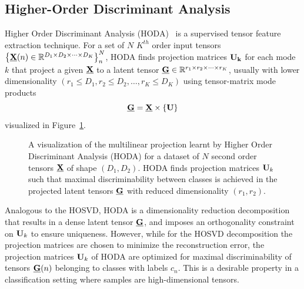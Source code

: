 \documentclass[twocolumn]{article}
\begin{document}
\subsection{Higher-Order Discriminant Analysis}
Higher Order Discriminant Analysis (\textsc{HODA})~\cite{Phan2010} is a
supervised tensor
feature extraction technique. For a set of $N$ $K^{th}$ order input tensors
$\left\{\underline{\mathbf{X}}(n)\in\mathbb{R}^{D_1\times D_2 \times \cdots \times
		D_K}\right\}_n^N$, \textsc{HODA} finds projection matrices $\mathbf{U_k}$ for each mode $k$
that project a given $\underline{\mathbf{X}}$ to a latent tensor
$\underline{\mathbf{G}}\in\mathbb{R}^{r_1\times r_2\times\cdots\times r_K}$, usually with lower
dimensionality $(r_1\leq D_1,r_2\leq D_2,\ldots,r_K\leq D_K)$ using
tensor-matrix mode products
\begin{equation}
	\underline{\mathbf{G}}  = \underline{\mathbf{X}}\times\left\{\mathbf{U}\right\}
	\label{eq:HODA-backward}
\end{equation}
visualized in Figure~\ref{fig:HODA-backward}.
\begin{figure}[t]
	\centering
	
	\caption{A visualization of the multilinear projection learnt by Higher Order
		Discriminant Analysis (\textsc{HODA}) for a dataset of $N$ second order tensors
		$\underline{\mathbf{X}}$ of shape $(D_1,D_2)$.
		\textsc{HODA} finds projection matrices $\mathbf{U}_k$ such that maximal
		discriminability between classes is achieved in the projected latent tensors
		$\underline{\mathbf{G}}$ with reduced dimensionality $(r_1,r_2)$.}
	\label{fig:HODA-backward}
\end{figure}
Analogous to the \textsc{HOSVD}, \textsc{HODA} is a dimensionality
reduction decomposition that results in a dense latent tensor $\underline{\mathbf{G}}$, and
imposes an orthogonality constraint on $\mathbf{U}_k$ to ensure uniqueness.
However, while for the \textsc{HOSVD} decomposition the projection matrices
are chosen to minimize the reconstruction error, the projection matrices
$\mathbf{U}_k$ of \textsc{HODA} are optimized for maximal discriminability of tensors
$\underline{\mathbf{G}}(n)$ belonging to classes with labels $c_n$.
This is a desirable property in a classification setting where samples are
high-dimensional tensors.
\end{document}
